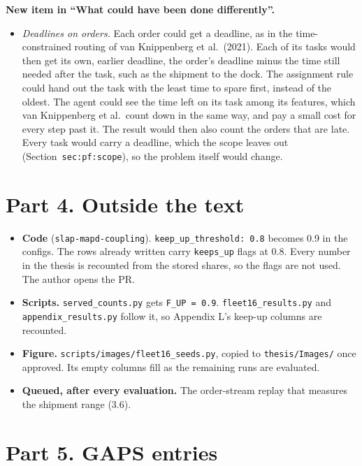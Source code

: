 \documentclass[11pt,a4paper]{article}
\newcommand{\new}[1]{\textcolor{newc}{#1}}
\begin{document}
\textbf{New item in ``What could have been done differently''.}
\begin{itemize}[leftmargin=1.2em]
\item \new{\emph{Deadlines on orders.} Each order could get a deadline, as
  in the time-constrained routing of van Knippenberg et al.\ (2021). Each of
  its tasks would then get its own, earlier deadline, the order's deadline
  minus the time still needed after the task, such as the shipment to the
  dock. The assignment rule could hand out the task with the least time to
  spare first, instead of the oldest. The agent could see the time left on
  its task among its features, which van Knippenberg et al.\ count down in
  the same way, and pay a small cost for every step past it. The result
  would then also count the orders that are late. Every task would carry a
  deadline, which the scope leaves out (Section~\texttt{sec:pf:scope}), so
  the problem itself would change.}
\end{itemize}

\section*{Part 4. Outside the text}
\begin{itemize}[leftmargin=1.2em]
\item \textbf{Code} (\texttt{slap-mapd-coupling}). \texttt{keep\_up\_threshold:
  0.8} becomes 0.9 in the configs. The rows already written carry
  \texttt{keeps\_up} flags at 0.8. Every number in the thesis is recounted
  from the stored shares, so the flags are not used. The author opens the PR.
\item \textbf{Scripts.} \texttt{served\_counts.py} gets \texttt{F\_UP = 0.9}.
  \texttt{fleet16\_results.py} and \texttt{appendix\_results.py} follow it,
  so Appendix L's keep-up columns are recounted.
\item \textbf{Figure.} \texttt{scripts/images/fleet16\_seeds.py}, copied to
  \texttt{thesis/Images/} once approved. Its empty columns fill as the
  remaining runs are evaluated.
\item \textbf{Queued, after every evaluation.} The order-stream replay that
  measures the shipment range (3.6).
\end{itemize}

\section*{Part 5. GAPS entries}
\end{document}
